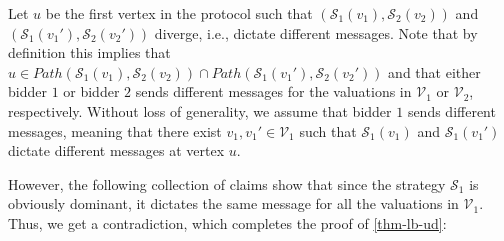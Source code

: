 Let $u$ be the first vertex in the protocol such that 
 $(\mathcal{S}_1(v_1),\mathcal{S}_2(v_2))$ and $(\mathcal{S}_1(v_1'),\mathcal{S}_2(v_2'))$ diverge, i.e., dictate different messages. 
Note that by definition this implies that $u\in Path(\mathcal{S}_1(v_1),\mathcal{S}_2(v_2))\cap Path(\mathcal{S}_1(v_1'),\mathcal{S}_2(v_2'))$ and that either bidder $1$ or bidder $2$ sends different messages for the valuations in $\mathcal{V}_1$ or $\mathcal V_2$, respectively. 
Without loss of generality, we assume that bidder $1$ sends different messages, meaning that there exist $v_1,v_1'\in \mathcal{V}_1$ such that $\mathcal S_1(v_1)$ and $\mathcal S_1(v_1')$ dictate different messages at vertex $u$.
\begin{comment}
Observe that either bidder $1$ or $2$ has to send different messages for different valuations in $\mathcal V_i$ at some vertex. 
This is an immediate implication of \cref{lemma-ud-instances}. The reason for it is that since 
the mechanism $A$ outputs different allocations for different valuation profiles in $\mathcal V_1\times \mathcal V_2$, 
these valuation profiles end up in different leaves, so they necessarily diverge at some vertex.
 
 Let $u$ be the first vertex in the protocol of the mechanism $A$ where they diverge, meaning that  the behavior profiles $(\mathcal{S}_1(v_1),\mathcal{S}_2(v_2))$ and $(\mathcal{S}_1(v_1'),\mathcal{S}_2(v_2'))$ dictate different messages. 
Note that by definition $u\in Path(\mathcal{S}_1(v_1),\mathcal{S}_2(v_2))\cap Path(\mathcal{S}_1(v_1'),\mathcal{S}_2(v_2'))$. We remind that each vertex is associated with only one player that sends messages in it. Note that the distribution $\mathcal D$ we have defined is symmetric, so we can assume without loss of generality that player $1$ is the player that sends a message in vertex $u$. Thus, there exist $v_1,v_1'\in \mathcal{V}_1$ such that $\mathcal S_1(v_1)$ and $\mathcal S_1(v_1')$ dictate different messages at vertex $u$. 
\end{comment}
However, the following collection of claims show that since the strategy $\mathcal S_1$ is obviously dominant, it dictates the same message for all the valuations in $\mathcal{V}_1$. Thus, we get a contradiction, which completes the proof of \cref{thm-lb-ud}:

